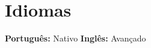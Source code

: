 \documentclass[a4paper,10pt]{article}
\begin{document}
\section{Idiomas}
\textbf{Português:} Nativo \hspace{2em} \textbf{Inglês:} Avançado
\end{document}
